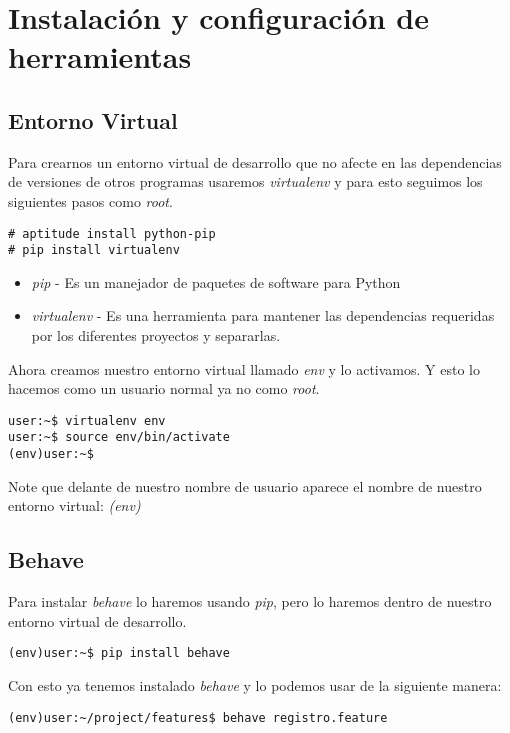 
\chapter{Instalación y configuración de herramientas}

\newpage

\section{Entorno Virtual}
Para crearnos un entorno virtual de desarrollo que no afecte en las dependencias
de versiones de otros programas usaremos {\it virtualenv} y para esto seguimos
los siguientes pasos como {\it root}.

\begin{verbatim}
# aptitude install python-pip
# pip install virtualenv
\end{verbatim}

\begin{itemize}
  \item {\it pip} - Es un manejador de paquetes de software para Python
  \item {\it virtualenv} - Es una herramienta para mantener las dependencias
    requeridas por los diferentes proyectos y separarlas.
\end{itemize}

Ahora creamos nuestro entorno virtual llamado {\it env} y lo activamos. Y esto
lo hacemos como un usuario normal ya no como {\it root}.

\begin{verbatim}
user:~$ virtualenv env
user:~$ source env/bin/activate
(env)user:~$
\end{verbatim}

Note que delante de nuestro nombre de usuario aparece el nombre de nuestro
entorno virtual: {\it (env)}

\section{Behave}
Para instalar {\it behave} lo haremos usando {\it pip}, pero lo haremos dentro
de nuestro entorno virtual de desarrollo.

\begin{verbatim}
(env)user:~$ pip install behave
\end{verbatim}

Con esto ya tenemos instalado {\it behave} y lo podemos usar de la siguiente manera:

\begin{verbatim}
(env)user:~/project/features$ behave registro.feature
\end{verbatim}

